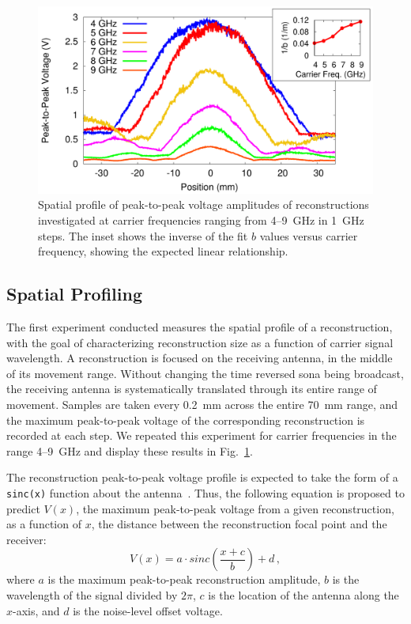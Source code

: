 \documentclass[conference]{IEEEtran}
\newcommand{\numrange}[2]{#1--#2}
\begin{document}
\begin{figure}[t!]
\includegraphics[width=\columnwidth]{figs/freq_profile.pdf}
\caption{Spatial profile of peak-to-peak voltage amplitudes of reconstructions
investigated at carrier frequencies ranging from \numrange{4}{9}~GHz in 1~GHz
steps. The inset shows the inverse of the fit $b$ values versus carrier
frequency, showing the expected linear relationship.}
\label{fig:freq_profile}
\end{figure}


\subsection{Spatial Profiling}
\label{sec:spatial}

The first experiment conducted measures the spatial profile of a reconstruction,
with the goal of characterizing reconstruction size as a function of carrier
signal wavelength.
%
A reconstruction is focused on the receiving antenna, in the middle of its
movement range.
%
Without changing the time reversed sona being broadcast, the receiving antenna
is systematically translated through its entire range of movement.
%
Samples are taken every 0.2~mm across the entire 70~mm range, and the
maximum peak-to-peak voltage of the corresponding reconstruction is recorded at
each step.
%
We repeated this experiment for carrier frequencies in the range
\numrange{4}{9}~GHz and display these results in Fig.~\ref{fig:freq_profile}.



The reconstruction peak-to-peak voltage profile is expected to take the form of
a \texttt{sinc(x)} function about the antenna~\cite{lerosey-focusing}.
%
Thus, the following equation is proposed to predict $V(x)$, the maximum
peak-to-peak voltage from a given reconstruction, as a function of $x$, the
distance between the reconstruction focal point and the receiver:
%
\begin{equation}\label{eq:vx}
V(x)=a\cdot sinc\left(\frac{x+c}{b}\right)+d\,,
\end{equation}
%
\noindent where $a$ is the maximum peak-to-peak reconstruction amplitude, $b$ is
the wavelength of the signal divided by $2\pi$, $c$ is the location of the
antenna along the $x$-axis, and $d$ is the noise-level offset voltage.
\end{document}
